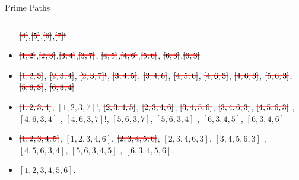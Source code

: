 \documentclass[handout]{beamer}
\newcommand\hcancel[2][red]{\setbox0=\hbox{$#2$}%
\rlap{\raisebox{.45\ht0}{\textcolor{#1}{\rule{\wd0}{1pt}}}}#2}
\begin{document}
\begin{frame}{Prime Paths}
\begin{columns}
\begin{column}{0.65\textwidth}
\begin{itemize}
    $\hcancel{[4]}$,$\hcancel{[5]}$,$\hcancel{[6]}$,$\hcancel{[7]!}$
  \item $\hcancel{[1,2]}$,$\hcancel{[2,3]}$,$\hcancel{[3,4]}$,$\hcancel{[3,7]}$, $\hcancel{[4,5]}$,$\hcancel{[4,6]}$,$\hcancel{[5,6]}$,
    $\hcancel{[6,3]}$,$\hcancel{[6,3]}$
  \item $\hcancel{[1,2,3]}$, $\hcancel{[2,3,4]}$, $\hcancel{[2,3,7]!}$, $\hcancel{[3,4,5]}$, $\hcancel{[3,4,6]}$,
    $\hcancel{[4,5,6]}$, $\hcancel{[4,6,3]}$, $\hcancel{[4,6,3]}$, $\hcancel{[5,6,3]}$, $\hcancel{[5,6,3]}$, $\hcancel{[6,3,4]}$
  \item $\hcancel{[1,2,3,4]}$, $[1,2,3,7]!$, $\hcancel{[2,3,4,5]}$,
    $\hcancel{[2,3,4,6]}$, $\hcancel{[3,4,5,6]}$,
    $\hcancel{[3,4,6,3]}$, $\hcancel{[4,5,6,3]}$ , $[4,6,3,4]$ ,
    $[4,6,3,7]!$, $[5,6,3,7]$, $[5,6,3,4]$ ,
    $[6,3,4,5]$,
    $[6,3,4,6]$
  \item $\hcancel{[1,2,3,4,5]}$, $[1,2,3,4,6]$,
    $\hcancel{[2,3,4,5,6]}$,
    $[2,3,4,6,3]$,
    $[3,4,5,6,3]$ , $[4, 5, 6, 3, 4]$, $[5, 6, 3, 4, 5]$ , $[6, 3, 4, 5, 6]$, 
  \item $[1,2,3,4,5,6]$.
 \end{itemize}
\end{column}
\end{columns}
\end{frame}
\end{document}
